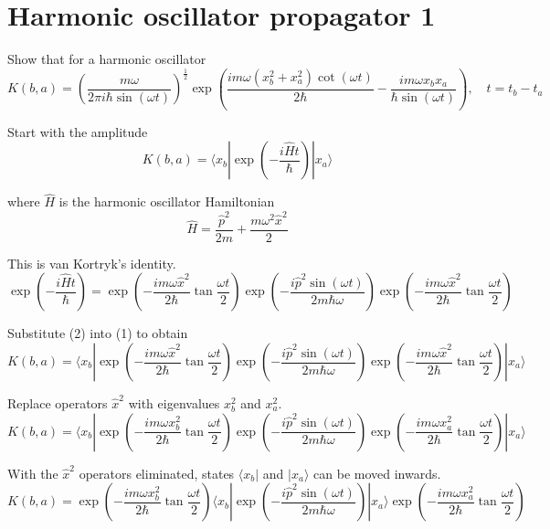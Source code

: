 

\section*{Harmonic oscillator propagator 1}

Show that for a harmonic oscillator
\begin{equation*}
K(b,a)=\left(\frac{m\omega}{2\pi i\hbar\sin(\omega t)}\right)^\frac{1}{2}
\exp\left(\frac{im\omega(x_b^2+x_a^2)\cot(\omega t)}{2\hbar}
-\frac{im\omega x_bx_a}{\hbar\sin(\omega t)}\right),\quad t=t_b-t_a
\end{equation*}

Start with the amplitude
\begin{equation*}
K(b,a)=\langle x_b|\exp\left(-\frac{i\hat Ht}{\hbar}\right)
|x_a\rangle
\tag{1}
\end{equation*}

where $\hat H$ is the harmonic oscillator Hamiltonian
\begin{equation*}
\hat H=\frac{\hat p^2}{2m}+\frac{m\omega^2\hat x^2}{2}
\end{equation*}

This is van Kortryk's identity.
\begin{equation*}
\exp\left(-\frac{i\hat Ht}{\hbar}\right)=
\exp\left(-\frac{im\omega\hat x^2}{2\hbar}\tan\frac{\omega t}{2}\right)
\exp\left(-\frac{i\hat p^2\sin(\omega t)}{2m\hbar\omega}\right)
\exp\left(-\frac{im\omega\hat x^2}{2\hbar}\tan\frac{\omega t}{2}\right)
\tag{2}
\end{equation*}

Substitute (2) into (1) to obtain
\begin{equation*}
K(b,a)=\langle x_b|\exp\left(-\frac{im\omega\hat x^2}{2\hbar}\tan\frac{\omega t}{2}\right)
\exp\left(-\frac{i\hat p^2\sin(\omega t)}{2m\hbar\omega}\right)
\exp\left(-\frac{im\omega\hat x^2}{2\hbar}\tan\frac{\omega t}{2}\right)
|x_a\rangle
\end{equation*}

Replace operators $\hat x^2$ with eigenvalues $x_b^2$ and $x_a^2$.
\begin{equation*}
K(b,a)=
\langle x_b|
\exp\left(-\frac{im\omega x_b^2}{2\hbar}\tan\frac{\omega t}{2}\right)
\exp\left(-\frac{i\hat p^2\sin(\omega t)}{2m\hbar\omega}\right)
\exp\left(-\frac{im\omega x_a^2}{2\hbar}\tan\frac{\omega t}{2}\right)
|x_a\rangle
\end{equation*}

With the $\hat x^2$ operators eliminated, states $\langle x_b|$ and $|x_a\rangle$ can be moved inwards.
\begin{equation*}
K(b,a)=
\exp\left(-\frac{im\omega x_b^2}{2\hbar}\tan\frac{\omega t}{2}\right)
\langle x_b|
\exp\left(-\frac{i\hat p^2\sin(\omega t)}{2m\hbar\omega}\right)
|x_a\rangle
\exp\left(-\frac{im\omega x_a^2}{2\hbar}\tan\frac{\omega t}{2}\right)
\end{equation*}

